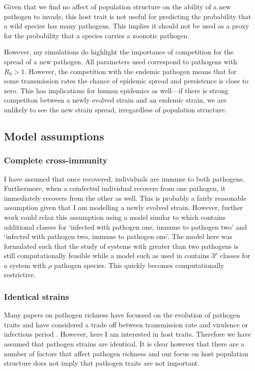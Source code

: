 Given that we find no affect of population structure on the ability of a new pathogen to invade, this host trait is not useful for predicting the probability that a wild species has many pathogens.
This implies it should not be used as a proxy for the probability that a species carries a zoonotic pathogen.

However, my simulations do highlight the importance of competition for the spread of a new pathogen.
All parameters used correspond to pathogens with $R_0>1$.
However, the competition with the endemic pathogen means that for some transmission rates the chance of epidemic spread and persistence is close to zero.
This has implications for human epidemics as well---if there is strong competiton between a newly evolved strain and an endemic strain, we are unlikely to see the new strain spread, irregardless of population structure.




\subsection{Model assumptions}

\subsubsection{Complete cross-immunity}

I have assumed that once recovered, individuals are immune to both pathogens. 
Furthermore, when a coinfected individual recovers from one pathogen, it immediately recovers from the other as well.
This is probably a fairly reasonable assumption given that I am modelling a newly evolved strain.
However, further work could relax this assumption using a model similar to \cite{poletto2015characterising} which contains additional classes for `infected with pathogen one, immune to pathogen two' and `infected with pathogen two, immune to pathogen one'.
The model here was formulated such that the study of systems with greater than two pathogens is still computationally feasible while a model such as used in \cite{poletto2015characterising} contains $3^\rho$ classes for a system with $\rho$ pathogen species.
This quickly becomes computationally restrictive.

\subsubsection{Identical strains}

Many papers on pathogen richness have focussed on the evolution of pathogen traits and have considered a trade off between transmission rate and virulence \cite{nowak1994superinfection, nowak1994superinfection} or infectious period \cite{poletto2013host}.
However, here I am interested in host traits.
Therefore we have assumed that pathogen strains are identical.
It is clear however that there are a number of factors that affect pathogen richness and our focus on host population structure does not imply that pathogen traits are not important.

